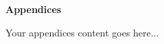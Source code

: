 \par\noindent\textbf{\huge{\color{blue}Appendices}}

\vspace{3cm}

Your appendices content goes here...

\vspace{1cm}

\newpage
\thispagestyle{empty} %
\hspace{1cm} %

\newpage